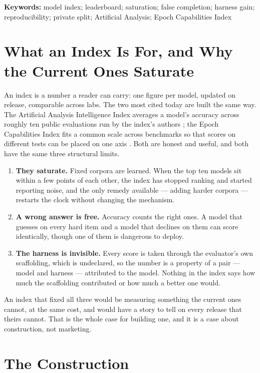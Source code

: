 \noindent\textbf{Keywords:} model index; leaderboard; saturation; false completion; harness gain; reproducibility; private split; Artificial Analysis; Epoch Capabilities Index

\tableofcontents
\bigskip

\section{What an Index Is For, and Why the Current Ones Saturate}\label{sec:why}

An index is a number a reader can carry: one figure per model, updated on release, comparable across labs. The two most cited today are built the same way. The Artificial Analysis Intelligence Index averages a model's accuracy across roughly ten public evaluations run by the index's authors \citep{aa2026index}; the Epoch Capabilities Index fits a common scale across benchmarks so that scores on different tests can be placed on one axis \citep{epoch2026eci}. Both are honest and useful, and both have the same three structural limits.

\begin{enumerate}[leftmargin=*,itemsep=2pt]
\item \textbf{They saturate.} Fixed corpora are learned. When the top ten models sit within a few points of each other, the index has stopped ranking and started reporting noise, and the only remedy available --- adding harder corpora --- restarts the clock without changing the mechanism.
\item \textbf{A wrong answer is free.} Accuracy counts the right ones. A model that guesses on every hard item and a model that declines on them can score identically, though one of them is dangerous to deploy.
\item \textbf{The harness is invisible.} Every score is taken through the evaluator's own scaffolding, which is undeclared, so the number is a property of a pair --- model and harness --- attributed to the model. Nothing in the index says how much the scaffolding contributed or how much a better one would.
\end{enumerate}

An index that fixed all three would be measuring something the current ones cannot, at the same cost, and would have a story to tell on every release that theirs cannot. That is the whole case for building one, and it is a case about construction, not marketing.

\section{The Construction}\label{sec:construction}

